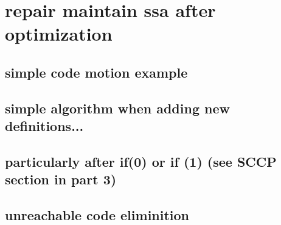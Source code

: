 \chapter*{repair maintain ssa after optimization}


\section{simple code motion example}
\section{simple algorithm when adding new definitions...}
\section{particularly after if(0) or if (1) (see SCCP section in part 3)}
\section{unreachable code eliminition}


